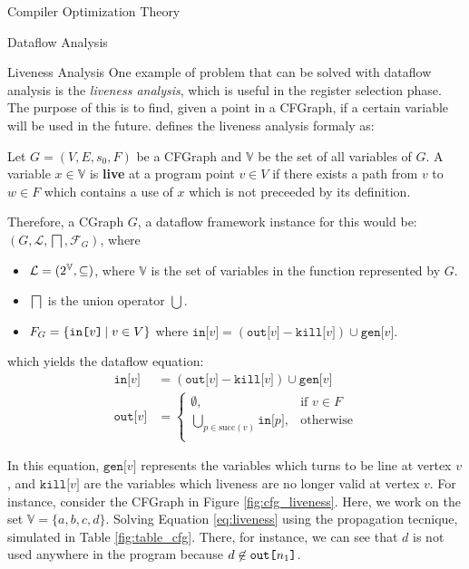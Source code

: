 \begin{section}{Compiler Optimization Theory}
\begin{subsection}{Dataflow Analysis}
	

	\begin{subsubsection}{Liveness Analysis}
		One example of problem that can be solved with dataflow analysis is the \textit{liveness analysis},
		which is useful in the register selection phase. The purpose of this is to find, given a point
		in a CFGraph, if a certain variable will be used in the future. \cite{khedker2009data} defines the liveness analysis formaly as:
\begin{definition}
	Let $G = (V, E, s_0, F)$ be a CFGraph and $\mathbb{V}$ be the set of all variables
	of $G$. A variable $x \in \mathbb{V}$ is \textbf{live} at a program point $v \in V$
	if there exists a path from $v$ to $w \in F$ which contains a use of $x$ which is
	not preceeded by its definition.
\end{definition}

Therefore, a CGraph $G$, a dataflow framework instance for this would be:
$(G, \mathcal{L}, \bigsqcap, \mathcal{F}_G)$, where
\begin{itemize}
	\item $\mathcal{L} = (2^\mathbb{V}, \subseteq)$, where $\mathbb{V}$ is the set of variables in the function represented by $G$.
	\item $\bigsqcap$ is the union operator $\bigcup$.
	\item $F_G = \{\texttt{in[} v \texttt{]}\,|\;v \in V\}$ where
	$\texttt{in[} v \texttt{]} = (\texttt{out[} v \texttt{]} - \texttt{kill[} v \texttt{]}) \cup \texttt{gen[} v \texttt{]}$.
\end{itemize}
which yields the dataflow equation:
\begin{equation}\label{eq:liveness}
\begin{split}
	\texttt{in[} v \texttt{]} &= (\texttt{out[} v \texttt{]} - \texttt{kill[} v \texttt{]}) \cup \texttt{gen[} v \texttt{]} \\
	\texttt{out[} v \texttt{]} &= 
	\begin{cases}
	  \emptyset,& \text{if } v \in F \\
	  \bigcup_{p \in \text{succ}(v)}\texttt{in[}p\texttt{]} ,& \text{otherwise} \\
	\end{cases}
\end{split}
\end{equation}

In this equation, $\texttt{gen[} v \texttt{]}$ represents the variables which turns
to be line at vertex $v$, and $\texttt{kill[} v \texttt{]}$ are the variables which
liveness are no longer valid at vertex $v$. For instance, consider the CFGraph
in Figure \ref{fig:cfg_liveness}. Here, we work on the set $\mathbb{V} = \{a, b, c, d\}$.
Solving Equation \ref{eq:liveness} using the propagation tecnique, simulated in Table
\ref{fig:table_cfg}. There, for instance, we can see that $d$ is not used anywhere
in the program because $d \not\in \texttt{out[} n_1\texttt{]}$.


\end{subsubsection}
\end{subsection}
\end{section}
